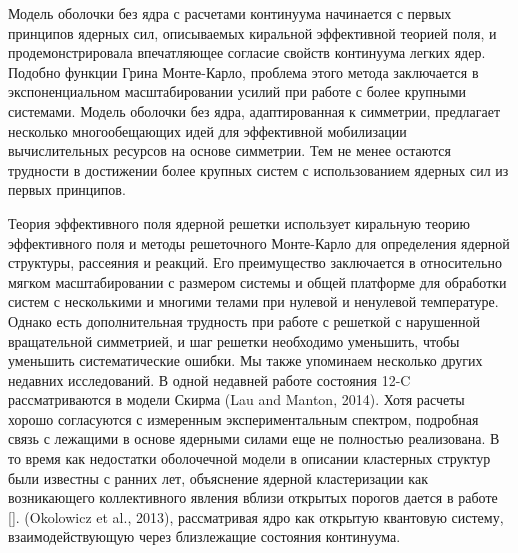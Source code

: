 \documentclass[fontsize=14pt]{scrarticle}
\begin{document}
Модель оболочки без ядра с расчетами континуума начинается с первых принципов ядерных сил, описываемых киральной эффективной теорией поля, и продемонстрировала впечатляющее согласие свойств континуума легких ядер. Подобно функции Грина Монте-Карло, проблема этого метода заключается в экспоненциальном масштабировании усилий при работе с более крупными системами. Модель оболочки без ядра, адаптированная к симметрии, предлагает несколько многообещающих идей для эффективной мобилизации вычислительных ресурсов на основе симметрии. Тем не менее остаются трудности в достижении более крупных систем с использованием ядерных сил из первых принципов.

Теория эффективного поля ядерной решетки использует киральную теорию эффективного поля и методы решеточного Монте-Карло для определения ядерной структуры, рассеяния и реакций. Его преимущество заключается в относительно мягком масштабировании с размером системы и общей платформе для обработки систем с несколькими и многими телами при нулевой и ненулевой температуре. Однако есть дополнительная трудность при работе с решеткой с нарушенной вращательной симметрией, и шаг решетки необходимо уменьшить, чтобы уменьшить систематические ошибки.
Мы также упоминаем несколько других недавних исследований. В одной недавней работе состояния 12-C рассматриваются в модели Скирма (Lau and Manton, 2014). Хотя расчеты хорошо согласуются с измеренным экспериментальным спектром, подробная связь с лежащими в основе ядерными силами еще не полностью реализована. В то время как недостатки оболочечной модели в описании кластерных структур были известны с ранних лет, объяснение ядерной кластеризации как возникающего коллективного явления вблизи открытых порогов дается в работе [\cite{5}]. (Okolowicz et al., 2013), рассматривая ядро как открытую квантовую систему, взаимодействующую через близлежащие состояния континуума.
\end{document}
